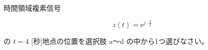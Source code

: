時間領域複素信号 

\[
z(t) = \textrm{e}^{ j \cdot \frac{\pi}{4}}
\]

\medskip
\noindent の $t = 4$ [秒]地点の位置を選択肢 a〜d の中から1つ選びなさい。
